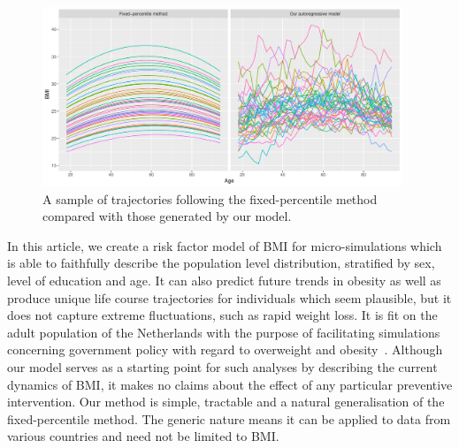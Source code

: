 \documentclass{imammb}
\numberwithin{equation}{section}
\begin{document}
\vspace{-4mm}

\begin{figure}[!h]
\centering
\includegraphics[width=0.96\textwidth] {"Figures/Individual Trajectories.pdf"}
\vspace*{-2pt}
\caption{A sample of trajectories following the fixed-percentile method compared with those generated by our model.}
\label{fig:Individual Trajectories}
\vspace*{-9pt}
\end{figure}

\vspace{1mm}

In this article, we create a risk factor model of BMI for micro-simulations which is able to faithfully describe the population level distribution, stratified by sex, level of education and age. It can also predict future trends in obesity as well as produce unique life course trajectories for individuals which seem plausible, but it does not capture extreme fluctuations, such as rapid weight loss. It is fit on the adult population of the Netherlands with the purpose of facilitating simulations concerning government policy with regard to overweight and obesity~\citep{TenDam2023}. Although our model serves as a starting point for such analyses by describing the current dynamics of BMI, it makes no claims about the effect of any particular preventive intervention. Our method is simple, tractable and a natural generalisation of the fixed-percentile method. The generic nature means it can be applied to data from various countries and need not be limited to BMI.
\end{document}
